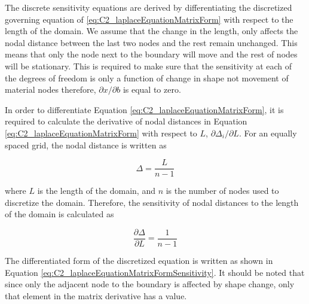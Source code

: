 The discrete sensitivity equations are derived by differentiating the discretized governing equation of \eqref{eq:C2_laplaceEquationMatrixForm} with respect to the length of the domain. We assume that the change in the length, only affects the nodal distance between the last two nodes and the rest remain unchanged. This means that only the node next to the boundary will move and the rest of nodes will be stationary. This is required to make sure that the sensitivity at each of the degrees of freedom is only a function of change in shape not movement of material nodes therefore, $\partial x/\partial b$ is equal to zero.

In order to differentiate Equation  \eqref{eq:C2_laplaceEquationMatrixForm}, it is required to calculate the derivative of nodal distances in Equation \eqref{eq:C2_laplaceEquationMatrixForm} with respect to $L$, $\partial \Delta_i/\partial L$. For an equally spaced grid, the nodal distance is written as

\begin{equation*}
	\Delta = \frac{L}{n - 1}
\end{equation*}

where $L$ is the length of the domain, and $n$ is the number of nodes used to discretize the domain. Therefore, the sensitivity of nodal distances to the length of the domain is calculated as

\begin{equation}\label{eq:C2_nodeDistanceSensitivity}
	\frac{\partial \Delta}{\partial L} = \frac{1}{n-1}
\end{equation}

The differentiated form of the discretized equation is written as shown in Equation \eqref{eq:C2_laplaceEquationMatrixFormSensitivity}. It should be noted that since only the adjacent node to the boundary is affected by shape change, only that element in the matrix derivative has a value.

